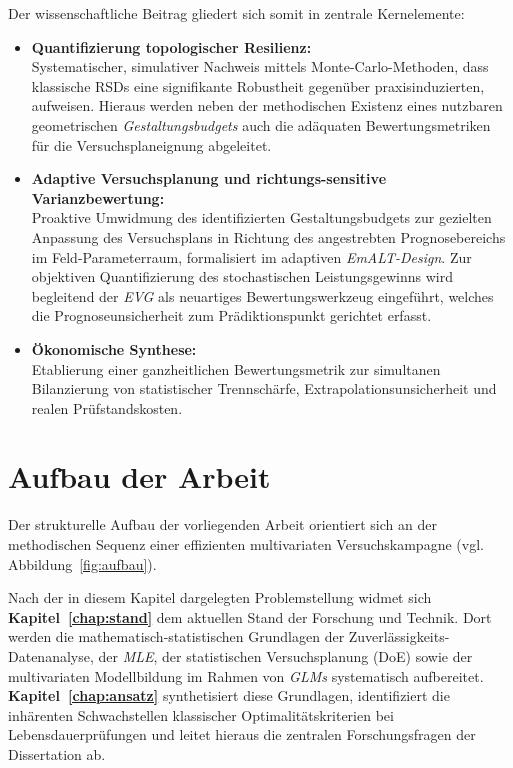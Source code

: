 Der wissenschaftliche Beitrag gliedert sich somit in  zentrale Kernelemente:

\begin{itemize}
      \item \textbf{Quantifizierung topologischer Resilienz:}\\
            Systematischer, simulativer Nachweis mittels Monte-Carlo-Methoden, dass klassische \acp{RSD} eine signifikante Robustheit gegenüber praxis\-in\-duzierten,  aufweisen.
            Hier\-aus werden neben der methodischen Existenz eines nutzbaren geometrischen \textit{Gestaltungsbudgets} auch die adäquaten Bewertungsmetriken für die Versuchsplaneignung abgeleitet.
      \item \textbf{Adaptive Versuchsplanung und richtungs-sensitive Varianzbewertung:}\\
            Pro\-ak\-tive Umwidmung des identifizierten Gestaltungsbudgets zur gezielten Anpassung des Versuchsplans in Richtung des angestrebten Prognosebereichs im Feld-Parameterraum, formalisiert im adaptiven \textit{\ac{EmALT}-Design}.
            Zur objektiven Quantifizierung des stochastischen Leistungsgewinns wird begleitend der \textit{\ac{EVG}} als neuartiges Bewertungswerkzeug eingeführt, welches die Prognoseunsicherheit zum Prädiktionspunkt gerichtet erfasst.
      \item \textbf{Ökonomische Synthese:}\\
            Etablierung einer ganzheitlichen Bewertungsmetrik zur simultanen Bilanzierung von statistischer Trennschärfe, Extrapolationsunsicherheit und realen Prüfstandskosten.
\end{itemize}


\section{Aufbau der Arbeit} \label{sec:aufbau}

Der strukturelle Aufbau der vorliegenden Arbeit orientiert sich an der methodischen Sequenz einer effizienten multivariaten Versuchskampagne (vgl. Abbildung~\ref{fig:aufbau}).

Nach der in diesem Kapitel dargelegten Problemstellung widmet sich \textbf{Kapitel~\ref{chap:stand}} dem aktuellen Stand der Forschung und Technik.
Dort werden die mathematisch-statistischen Grundlagen der Zu\-ver\-lässig\-keits-Daten\-analyse, der \textit{\ac{MLE}}, der statistischen Versuchsplanung (\ac{DoE}) sowie der multivariaten Modellbildung im Rahmen von \textit{\acp{GLM}} systematisch aufbereitet.
\textbf{Kapitel~\ref{chap:ansatz}} synthetisiert diese Grundlagen, identifiziert die inhärenten Schwachstellen klassischer Optimalitätskriterien bei Lebensdauerprüfungen und leitet hieraus die zentralen Forschungsfragen der Dissertation ab.


